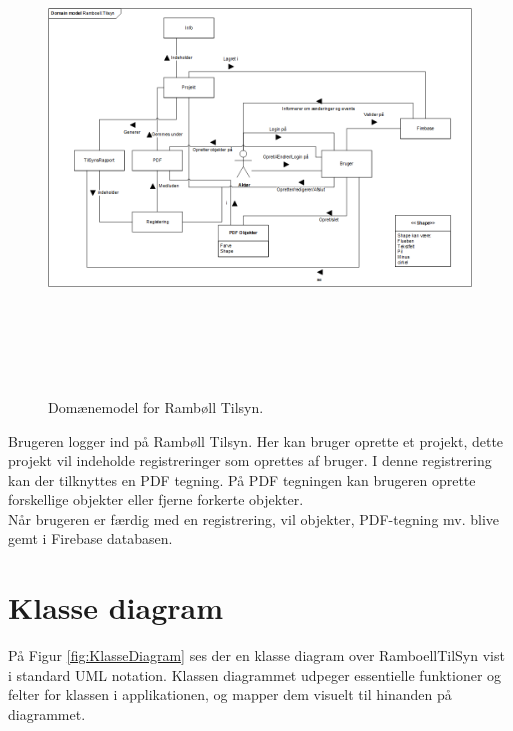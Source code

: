\begin{figure}[H] %
	\centering
	\includegraphics[height=13cm, width=17cm]{../ArkitekturDesign/OverordnetArkitektur/Domainmodel}
	\caption{Domænemodel for Rambøll Tilsyn.}
	\label{fig:Domain}
\end{figure}
Brugeren logger ind på Rambøll Tilsyn. Her kan bruger oprette et projekt, dette projekt vil indeholde registreringer som oprettes af bruger. I denne registrering kan der tilknyttes en PDF tegning. På PDF tegningen kan brugeren oprette forskellige objekter eller fjerne forkerte objekter. \\
Når brugeren er færdig med en registrering, vil objekter, PDF-tegning mv. blive gemt i Firebase databasen.

\clearpage

\section{Klasse diagram}
På Figur \ref{fig:KlasseDiagram} ses der en klasse diagram over RamboellTilSyn vist i standard UML notation. Klassen diagrammet udpeger essentielle funktioner og felter for klassen i applikationen, og mapper dem visuelt til hinanden på diagrammet. 

